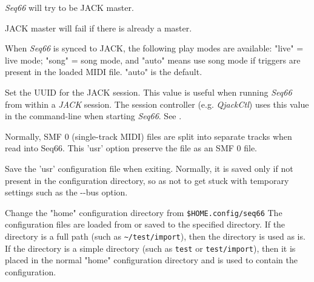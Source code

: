 
      \textsl{Seq66} will try to be JACK master.


      JACK master will fail if there is already a master.


      When \textsl{Seq66} is synced to JACK, the following play modes
      are available: "live" = live mode; "song" = song mode, and "auto" means
      use song mode if triggers are present in the loaded MIDI file. "auto" is
      the default.


      Set the UUID for the JACK session.  This value is useful when
      running \textsl{Seq66} from within a \textsl{JACK} session.
      The session controller (e.g. \textsl{QjackCtl}) uses this value in the
      command-line when starting \textsl{Seq66}.
      See .

      Normally, SMF 0 (single-track MIDI) files are split into separate tracks
      when read into Seq66.  This 'usr' option preserve the file as an SMF 0
      file.

      Save the 'usr' configuration file when exiting.
      Normally, it is saved only if not present in the configuration directory,
      so as not to get stuck with temporary settings such as the -{}-bus option.


      Change the "home" configuration directory from \texttt{\$HOME.config/seq66}
      The configuration files are loaded from or saved to the specified directory.
      If the directory is a full path (such as 
      \texttt{\textasciitilde/test/import}), then
      the directory is used as is.
      If the directory is a simple directory (such as \texttt{test}
      or \texttt{test/import}), then it
      is placed in the normal "home" configuration directory and is used
      to contain the configuration.

